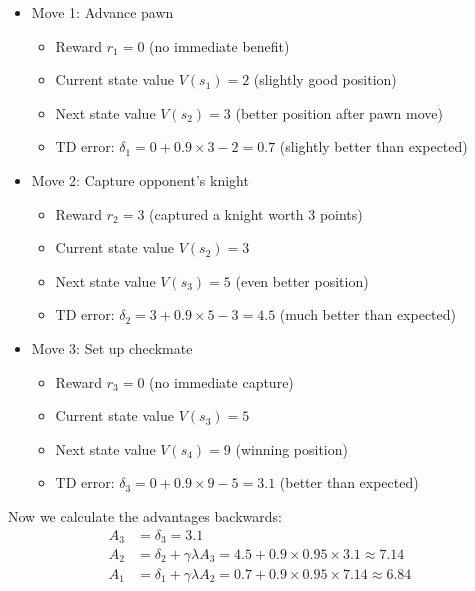 \documentclass[11pt]{article}
\begin{document}
\begin{itemize}
    \item Move 1: Advance pawn
        \begin{itemize}
            \item Reward $r_1 = 0$ (no immediate benefit)
            \item Current state value $V(s_1) = 2$ (slightly good position)
            \item Next state value $V(s_2) = 3$ (better position after pawn move)
            \item TD error: $\delta_1 = 0 + 0.9 \times 3 - 2 = 0.7$ (slightly better than expected)
        \end{itemize}
    
    \item Move 2: Capture opponent's knight
        \begin{itemize}
            \item Reward $r_2 = 3$ (captured a knight worth 3 points)
            \item Current state value $V(s_2) = 3$
            \item Next state value $V(s_3) = 5$ (even better position)
            \item TD error: $\delta_2 = 3 + 0.9 \times 5 - 3 = 4.5$ (much better than expected)
        \end{itemize}
    
    \item Move 3: Set up checkmate
        \begin{itemize}
            \item Reward $r_3 = 0$ (no immediate capture)
            \item Current state value $V(s_3) = 5$
            \item Next state value $V(s_4) = 9$ (winning position)
            \item TD error: $\delta_3 = 0 + 0.9 \times 9 - 5 = 3.1$ (better than expected)
        \end{itemize}
\end{itemize}

Now we calculate the advantages backwards:
\begin{align*}
    A_3 &= \delta_3 = 3.1 \\
    A_2 &= \delta_2 + \gamma \lambda A_3 = 4.5 + 0.9 \times 0.95 \times 3.1 \approx 7.14 \\
    A_1 &= \delta_1 + \gamma \lambda A_2 = 0.7 + 0.9 \times 0.95 \times 7.14 \approx 6.84
\end{align*}
\end{document}
